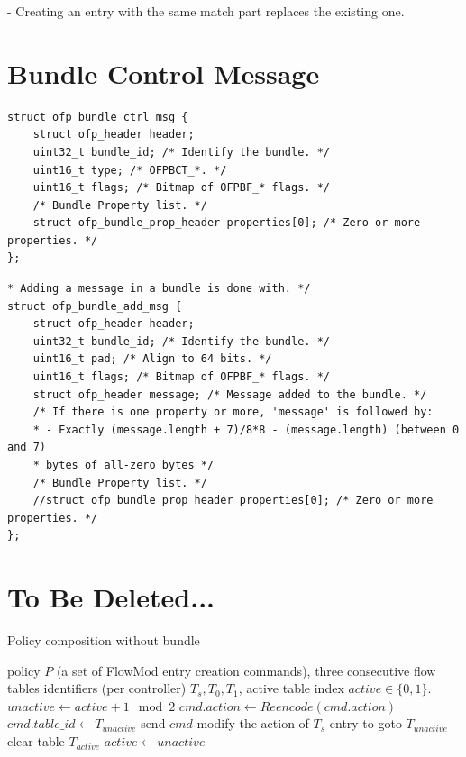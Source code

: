 \documentclass[conference]{sigcomm-alternate}
\begin{document}
\begin{appendix}
- Creating an entry with the same match part replaces the existing one.

\section{Bundle Control Message}

\begin{lstlisting}
struct ofp_bundle_ctrl_msg {
	struct ofp_header header;
	uint32_t bundle_id; /* Identify the bundle. */
	uint16_t type; /* OFPBCT_*. */
	uint16_t flags; /* Bitmap of OFPBF_* flags. */
	/* Bundle Property list. */
	struct ofp_bundle_prop_header properties[0]; /* Zero or more properties. */
};
\end{lstlisting}

\begin{lstlisting}
* Adding a message in a bundle is done with. */
struct ofp_bundle_add_msg {
	struct ofp_header header;
	uint32_t bundle_id; /* Identify the bundle. */
	uint16_t pad; /* Align to 64 bits. */
	uint16_t flags; /* Bitmap of OFPBF_* flags. */
	struct ofp_header message; /* Message added to the bundle. */
	/* If there is one property or more, 'message' is followed by:
	* - Exactly (message.length + 7)/8*8 - (message.length) (between 0 and 7)
	* bytes of all-zero bytes */
	/* Bundle Property list. */
	//struct ofp_bundle_prop_header properties[0]; /* Zero or more properties. */
};
\end{lstlisting}

\section{To Be Deleted...}

\begin{algorithm}[h]
    \caption{Policy composition without bundle}
    \label{alg:wobundle}
    \begin{algorithmic}[1]
    \Require policy $P$ (a set of FlowMod entry creation commands), three consecutive flow tables identifiers (per controller) $T_s,T_0,T_1$, active table index $active\in\{0,1\}$.
    \State $unactive \gets active + 1 \mod{2}$
	    \State $cmd.action\gets Reencode(cmd.action)$
	    \State $cmd.table\_id\gets T_{unactive}$
	    \State send $cmd$
    \EndFor
    \State modify the action of $T_s$ entry to goto $T_{unactive}$
    \State clear table $T_{active}$
    \State $active \gets unactive$
	\Return


\end{algorithmic}
\end{algorithm}
\end{appendix}
\end{document}
